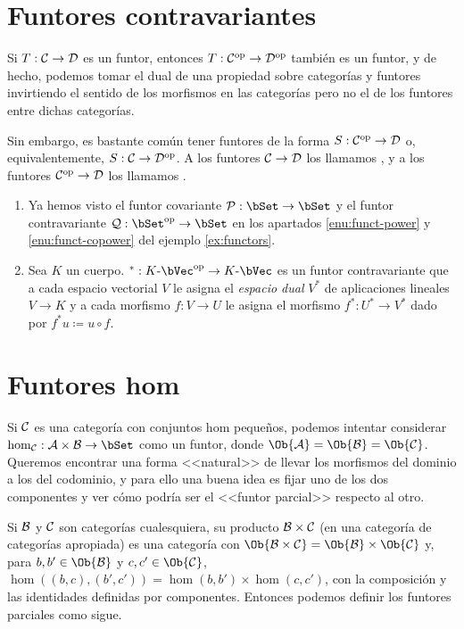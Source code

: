 \section{Funtores contravariantes}

Si $T:\mathcal{C}\to\mathcal{D}$ es un funtor, entonces $T:\mathcal{C}^{\mathrm{op}}\to\mathcal{D}^{\mathrm{op}}$ también es
un funtor, y de hecho, podemos tomar el dual de una propiedad sobre categorías y
funtores invirtiendo el sentido de los morfismos en las categorías pero no el de
los funtores entre dichas categorías.

Sin embargo, es bastante común tener funtores de la forma
$S:\mathcal{C}^{\mathrm{op}}\to\mathcal{D}$ o, equivalentemente, $S:\mathcal{C}\to\mathcal{D}^{\mathrm{op}}$. A los
funtores $\mathcal{C}\to\mathcal{D}$ los llamamos , y a los
funtores $\mathcal{C}^{\mathrm{op}}\to\mathcal{D}$ los llamamos .

\begin{example}\;
  \begin{enumerate}
  \item Ya hemos visto el funtor covariante $\power:\bSet\to\bSet$ y el funtor
    contravariante $\copower:\dual{\bSet}\to\bSet$ en los apartados
    \ref{enu:funct-power} y \ref{enu:funct-copower} del ejemplo
    \ref{ex:functors}.
  \item Sea $K$ un cuerpo. $^*:\dual{K\dash\bVec}\to K\dash\bVec$ es un funtor
    contravariante que a cada espacio vectorial $V$ le asigna el \emph{espacio
      dual} $V^*$ de aplicaciones lineales $V\to K$ y a cada morfismo $f:V\to U$
    le asigna el morfismo $f^*:U^*\to V^*$ dado por $f^*u\coloneqq u\circ f$.
    
  \end{enumerate}
\end{example}

\section{Funtores hom}

Si $\mathcal{C}$ es una categoría con conjuntos hom pequeños, podemos intentar
considerar $\hom_{\cC}:\cA\times\cB\to\bSet$ como un funtor, donde
$\Ob{\cA}=\Ob{\cB}=\Ob{\cC}$. Queremos encontrar una forma <<natural>> de llevar
los morfismos del dominio a los del codominio, y para ello una buena idea es
fijar uno de los dos componentes y ver cómo podría ser el <<funtor parcial>>
respecto al otro.

Si $\mathcal{B}$ y $\mathcal{C}$ son categorías cualesquiera, su producto $\mathcal{B}\times\mathcal{C}$ (en una
categoría de categorías apropiada) es una categoría con
$\Ob{\cB\times\cC}=\Ob{\cB}\times\Ob{\cC}$ y, para $b,b'\in\Ob{\cB}$ y
$c,c'\in\Ob{\cC}$, $\hom((b,c),(b',c'))=\hom(b,b')\times\hom(c,c')$, con la
composición y las identidades definidas por componentes. Entonces podemos
definir los funtores parciales como sigue.

